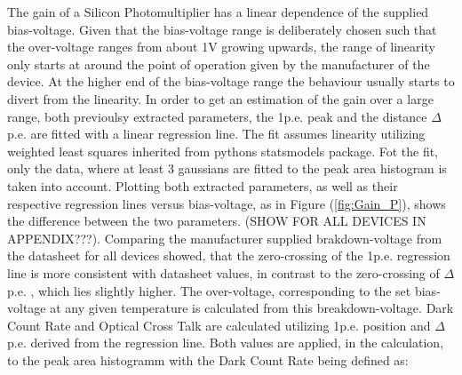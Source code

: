 \documentclass[12pt,article,type=msc,colorback,accentcolor=tud9c]{tudthesis}
\begin{document}
\newpage
\begin{wrapfigure}{R}{0.5\textwidth}
\centering
\texttt{[image: D:/OwnCloudData/00\_WriteUp/04\_Thesis/Pic/GainFit/\{GainFit\_delta\_pe]}.png}
\caption{\label{fig:Gain_P}1p.e. position and $\Delta$p.e. plotted versus bias-voltage}
\end{wrapfigure}
The gain of a Silicon Photomultiplier has a linear dependence of the supplied bias-voltage. Given that the bias-voltage range is deliberately chosen such that the over-voltage ranges from about 1V growing upwards, the range of linearity only starts at around the point of operation given by the manufacturer of the device. At the higher end of the bias-voltage range the behaviour usually starts to divert from the linearity. In order to get an estimation of the gain over a large range, both previoulsy extracted parameters, the 1p.e. peak and the distance $\Delta$p.e. are fitted with a linear regression line. The fit assumes linearity utilizing weighted least squares inherited from pythons statsmodels package. Fot the fit, only the data, where at least 3 gaussians are fitted to the peak area histogram is taken into account. Plotting both extracted parameters, as well as their respective regression lines versus bias-voltage, as in Figure (\ref{fig:Gain_P}), shows the difference between the two parameters. (SHOW FOR ALL DEVICES IN APPENDIX???). Comparing the manufacturer supplied brakdown-voltage from the datasheet for all devices showed, that the zero-crossing of the 1p.e. regression line is more consistent with datasheet values, in contrast to the zero-crossing of $\Delta$p.e. , which lies slightly higher. The over-voltage, corresponding to the set bias-voltage at any given temperature is calculated from this breakdown-voltage. 
Dark Count Rate and Optical Cross Talk are calculated utilizing 1p.e. position and $\Delta$p.e. derived from the regression line. Both values are applied, in the calculation, to the peak area histogramm with the Dark Count Rate being defined as:
\end{document}
